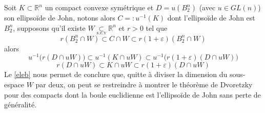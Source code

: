 \documentclass[12pt]{article}
\theoremstyle{definition}
\newcommand{\sev}{\underset{\text{s.e.v}}{\subset}}
\renewenvironment{leftbar}{%
	\def\FrameCommand{\vrule width 0.4pt \hspace{10pt}}%
	\MakeFramed {\advance\hsize-\width \FrameRestore}}%
{\endMakeFramed}
\begin{document}
\begin{leftbar}
\begin{rem}\label{rem0}
Soit $K\subset \mathbb{R}^n$ un compact convexe symétrique et $D=u(B_2^n)$ (avec $u\in GL(n)$) son ellipsoïde de John, notons alors $C=:u^{-1}(K)$ dont l'ellipsoïde de John est $B_2^n$, supposons qu'il existe $W\sev \mathbb{R}^n$ et $r>0$ tel que
\begin{equation*}
r (B_2^n\cap W)\subset C\cap W \subset r(1+\varepsilon)(B_2^n\cap W)
\end{equation*}
alors 
\begin{equation*}
u^{-1}\big(r(D\cap uW)\big)\subset u^{-1}(K\cap uW)\subset u^{-1}\big(r(1+\varepsilon)(D\cap uW)\big)
\end{equation*}
\begin{equation*}
r(D\cap uW)\subset K\cap uW \subset r(1+\varepsilon)(D\cap uW)
\end{equation*}
Le \cref{eleb} nous permet de conclure que, quitte à diviser la dimension du sous-espace $W$ par deux, on peut se restreindre à montrer le théorème de Dvoretzky pour des compacts dont la boule euclidienne est l'ellipsoïde de John sans perte de généralité.
\end{rem}\end{leftbar}
\end{document}

